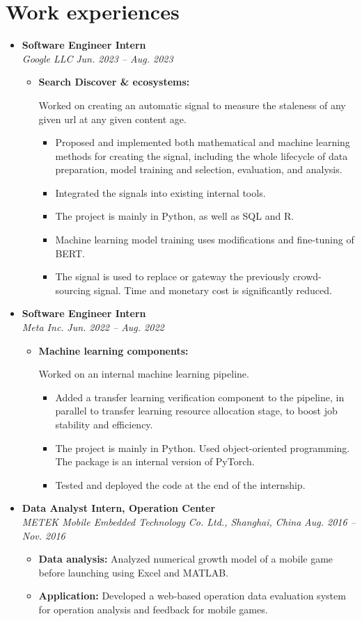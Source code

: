 \documentclass[letterpaper,11pt]{article}
\makeatletter
\newcommand{\resumeItem}[2]{
  \vspace{-3pt}
  \item{
    \textbf{#1}{#2}
  }
}
\newcommand{\resumeSubheading}[4]{
  \vspace{-7pt}\item
      \textbf{#1} \hfill #2 \\
      \textit{\small#3} \hfill \textit{\small #4}
  \vspace{-4pt}
}
\newcommand{\resumeSubHeadingListStart}{\begin{itemize}[leftmargin=*]}
\newcommand{\resumeSubHeadingListEnd}{\end{itemize}}
\newcommand{\resumeItemListStart}{\begin{itemize}}
\newcommand{\resumeItemListEnd}{\end{itemize}\vspace{-5pt}}
\makeatother
\begin{document}
\section{Work experiences}
  \resumeSubHeadingListStart
    \resumeSubheading
      {Software Engineer Intern}{}
      {Google LLC}{Jun. 2023 -- Aug. 2023}
      \resumeItemListStart
        \resumeItem{Search Discover \& ecosystems:}
          { Worked on creating an automatic signal to measure the staleness of any given url at any given content age. 
          \begin{itemize}[nosep]
          	\item Proposed and implemented both mathematical and machine learning methods for creating the signal, including the whole lifecycle of data preparation, model training and selection, evaluation, and analysis. 
		\item Integrated the signals into existing internal tools. 
		\item The project is mainly in Python, as well as SQL and R. 
		\item Machine learning model training uses modifications and fine-tuning of BERT.
		\item The signal is used to replace or gateway the previously crowd-sourcing signal. Time and monetary cost is significantly reduced.
	\end{itemize}}
      \resumeItemListEnd
    \resumeSubheading
      {Software Engineer Intern}{}
      {Meta Inc.}{Jun. 2022 -- Aug. 2022}
      \resumeItemListStart
        \resumeItem{Machine learning components:}
          { Worked on an internal machine learning pipeline.
          \begin{itemize}[nosep]
          	\item Added a transfer learning verification component to the pipeline, in parallel to transfer learning resource allocation stage, to boost job stability and efficiency.
		\item The project is mainly in Python. Used object-oriented programming. The package is an internal version of PyTorch.
		\item Tested and deployed the code at the end of the internship.
	  \end{itemize}}
      \resumeItemListEnd
    \resumeSubheading
      {Data Analyst Intern, Operation Center}{}
      {METEK Mobile Embedded Technology Co. Ltd., Shanghai, China}{Aug. 2016 -- Nov. 2016}
      \resumeItemListStart
        \resumeItem{Data analysis: }
          {Analyzed numerical growth model of a mobile game before launching using Excel and MATLAB.}
        \resumeItem{Application: }
          {Developed a web-based operation data evaluation system for operation analysis and feedback for mobile games.}
      \resumeItemListEnd
  \resumeSubHeadingListEnd
\end{document}
